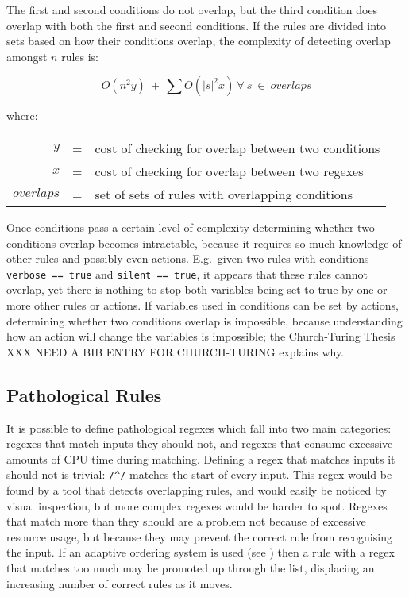 \noindent{}The first and second conditions do not overlap, but the third
condition does overlap with both the first and second conditions.  If the
rules are divided into sets based on how their conditions overlap, the
complexity of detecting overlap amongst $n$ rules is:

$$O(n^{2}y)~+~\sum{O(|s|^{2}x)~\forall{}~s~\in{}~overlaps}$$

where:

\begin{tabular}[]{rcl}

            $y$ & = & cost of checking for overlap between two conditions \\
            $x$ & = & cost of checking for overlap between two regexes    \\
     $overlaps$ & = & set of sets of rules with overlapping conditions    \\

\end{tabular}

Once conditions pass a certain level of complexity determining whether two
conditions overlap becomes intractable, because it requires so much
knowledge of other rules and possibly even actions.  E.g.\ given two rules
with conditions \verb!verbose == true! and \verb!silent == true!, it
appears that these rules cannot overlap, yet there is nothing to stop both
variables being set to true by one or more other rules or actions.  If
variables used in conditions can be set by actions, determining whether two
conditions overlap is impossible, because understanding how an action will
change the variables is impossible; the Church-Turing Thesis XXX NEED A BIB
ENTRY FOR CHURCH-TURING explains why.

\subsection{Pathological Rules}

It is possible to define pathological regexes which fall into two main
categories: regexes that match inputs they should not, and regexes that
consume excessive amounts of CPU time during matching.  Defining a regex
that matches inputs it should not is trivial: \verb!/^/! matches the start
of every input.  This regex would be found by a tool that detects
overlapping rules, and would easily be noticed by visual inspection, but
more complex regexes would be harder to spot.  Regexes that match more than
they should are a problem not because of excessive resource usage, but
because they may prevent the correct rule from recognising the input.  If
an adaptive ordering system is used (see ) then a rule with a regex that matches too much may be promoted
up through the list, displacing an increasing number of correct rules as it
moves.

